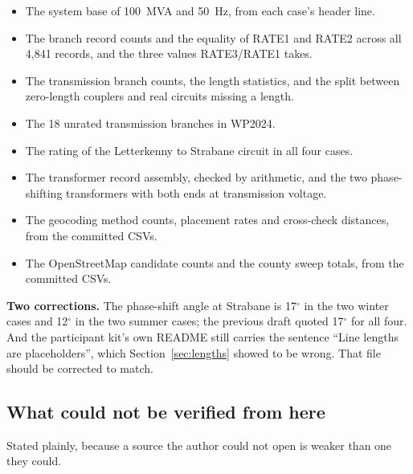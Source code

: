 \documentclass[11pt,a4paper]{article}
\begin{document}
\begin{itemize}
\item The system base of 100~MVA and 50~Hz, from each case's header line.
\item The branch record counts and the equality of RATE1 and RATE2 across all
      4{,}841 records, and the three values RATE3/RATE1 takes.
\item The transmission branch counts, the length statistics, and the split
      between zero-length couplers and real circuits missing a length.
\item The 18 unrated transmission branches in WP2024.
\item The rating of the Letterkenny to Strabane circuit in all four cases.
\item The transformer record assembly, checked by arithmetic, and the two
      phase-shifting transformers with both ends at transmission voltage.
\item The geocoding method counts, placement rates and cross-check distances,
      from the committed CSVs.
\item The OpenStreetMap candidate counts and the county sweep totals, from the
      committed CSVs.
\end{itemize}

\textbf{Two corrections.} The phase-shift angle at Strabane is 17$^\circ$ in
the two winter cases and 12$^\circ$ in the two summer cases; the previous draft
quoted 17$^\circ$ for all four. And the participant kit's own README still
carries the sentence ``Line lengths are placeholders'', which
Section~\ref{sec:lengths} showed to be wrong. That file should be corrected to
match.

\subsection{What could not be verified from here}

Stated plainly, because a source the author could not open is weaker than one
they could.
\end{document}
